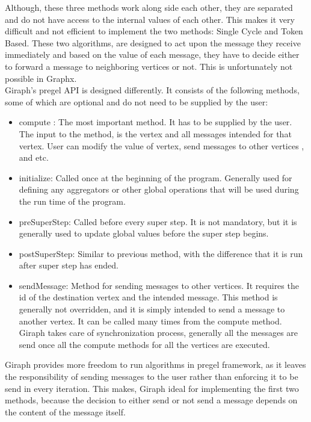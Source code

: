 \documentclass[english]{tktltiki}
\begin{document}
Although, these three methods work along side each other, they are separated and do not have access to the internal values of each other. This makes it very difficult and not efficient to implement the two methods: Single Cycle and Token Based. These two algorithms, are designed to act upon the message they receive immediately and based on the value of each message, they have to decide either to forward a message to neighboring vertices or not. This is unfortunately not possible in Graphx. \\
Giraph's pregel API is designed differently. It consists of the following methods, some of which are optional and do not need to be supplied by the user:
\begin{itemize}
\item compute : The most important method. It has to be supplied by the user. The input to the method, is the vertex and all messages intended for that vertex. User can modify the value of vertex, send messages to other vertices , and etc.
\item initialize: Called once at the beginning of the program. Generally used for defining any aggregators or other global operations that will be used during the run time of the program.
\item preSuperStep: Called before every super step. It is not mandatory, but it is generally used to update global values before the super step begins.
\item postSuperStep: Similar to previous method, with the difference that it is run after super step has ended.
\item sendMessage: Method for sending messages to other vertices. It requires the id of the destination vertex and the intended message. This method is generally not overridden, and it is simply intended to send a message to another vertex. It can be called many times from the compute method. Giraph takes care of synchronization process, generally all the messages are send once all the compute methods for all the vertices are executed.
\end{itemize}

Giraph provides more freedom to run algorithms in pregel framework, as it leaves the responsibility of sending messages to the user rather than enforcing it to be send in every iteration. This makes, Giraph ideal for implementing the first two methods, because the decision to either send or not send a message depends on the content of the message itself.

\newpage
\end{document}
